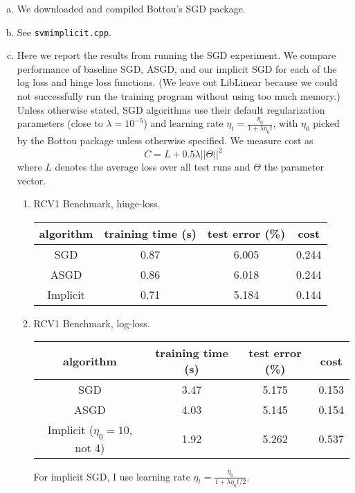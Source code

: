 \documentclass{article}
\begin{document}
\begin{enumerate}[(a)]
\item We downloaded and compiled Bottou's SGD package.
\item See \texttt{svmimplicit.cpp}.
\item Here we report the results from running the SGD experiment. We compare performance of baseline SGD, ASGD, and our implicit SGD for each of the log loss and hinge loss functions. (We leave out LibLinear because we could not successfully run the training program without using too much memory.) Unless otherwise stated, SGD algorithms use their default regularization parameters (close to $\lambda = 10^{-5}$) and learning rate $\eta_t = \frac{\eta_0}{1+ \lambda\eta_0 t}$, with $\eta_0$ picked by the Bottou package unless otherwise specified. We measure cost as $$C = L + 0.5 \lambda ||\Theta||^2$$ where $L$ denotes the average loss over all test runs and $\Theta$ the parameter vector.

\begin{enumerate}[1.]
\item RCV1 Benchmark, hinge-loss.
\begin{center}
\begin{tabular}{ c | c | c | c }
  algorithm & training time (s) & test error (\%) & cost \\ \hline                       
  SGD & 0.87 &  6.005 & 0.244\\
  ASGD & 0.86 & 6.018 & 0.244\\
  Implicit & 0.71 & 5.184 & 0.144\\
\end{tabular}
\end{center}

\item RCV1 Benchmark, log-loss.
\begin{center}
\begin{tabular}{ c | c | c | c }
  algorithm & training time (s) & test error (\%) & cost \\ \hline                       
  SGD & 3.47 &  5.175 & 0.153\\
  ASGD & 4.03 & 5.145 & 0.154\\
  Implicit ($\eta_0=10$, not 4) & 1.92 & 5.262 & 0.537\\
\end{tabular}
\end{center}
For implicit SGD, I use learning rate $\eta_t = \frac{\eta_0}{1+ \lambda\eta_0 t/2}$.


\end{enumerate}
\end{enumerate}
\end{document}
